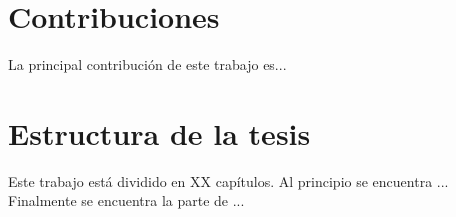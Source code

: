 \section{Contribuciones} %

La principal contribución de este trabajo es... 

\blindtext


\section{Estructura de la tesis} %

Este trabajo está dividido en XX capítulos. 
Al principio se encuentra ...
Finalmente se encuentra la parte de ...

